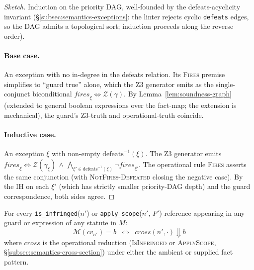 \begin{proof}[Sketch]
Induction on the priority DAG, well-founded by the
defeats-acyclicity invariant
(\S\ref{subsec:semantics-exceptions}: the linter rejects cyclic
\texttt{defeats} edges, so the DAG admits a topological sort;
induction proceeds along the reverse order).

\paragraph{Base case.} An exception with no in-degree in the
defeats relation. Its \textsc{Fires} premise simplifies to
``guard true'' alone, which the Z3 generator emits as the
single-conjunct biconditional $\mathit{fires}_\xi
\Leftrightarrow \mathcal{Z}(\gamma)$. By
Lemma~\ref{lem:soundness-graph} (extended to general boolean
expressions over the fact-map; the extension is mechanical), the
guard's Z3-truth and operational-truth coincide.

\paragraph{Inductive case.} An exception $\xi$ with non-empty
$\mathrm{defeats}^{-1}(\xi)$. The Z3 generator emits
$\mathit{fires}_\xi \Leftrightarrow \mathcal{Z}(\gamma_\xi)
\,\wedge\, \bigwedge_{\xi' \in \mathrm{defeats}^{-1}(\xi)}
\neg \mathit{fires}_{\xi'}$. The operational rule
\textsc{Fires} asserts the same conjunction (with
\textsc{NotFires-Defeated} closing the negative case). By the
IH on each $\xi'$ (which has strictly smaller priority-DAG depth)
and the guard correspondence, both sides agree.
\end{proof}

\begin{lemma}
\label{lem:soundness-cross}
For every \texttt{is\_infringed}($n'$) or
\texttt{apply\_scope}($n'$, $F'$) reference appearing in any
guard or expression of any statute in $M$:
\[
  \mathcal{M}(\mathit{cv}_{n'}) = b
  \;\;\Longleftrightarrow\;\;
  \mathit{cross}(n', \cdot) \Downarrow b
\]
where $\mathit{cross}$ is the operational reduction
(\textsc{IsInfringed} or \textsc{ApplyScope},
\S\ref{subsec:semantics-cross-section}) under either the ambient
or supplied fact pattern.
\end{lemma}

